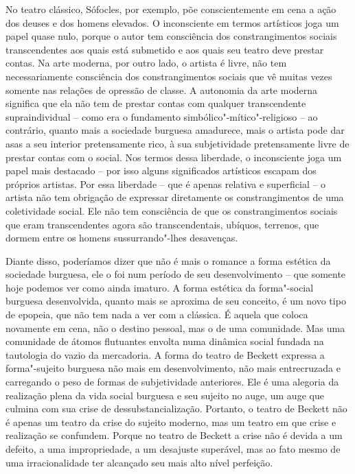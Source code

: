 {No teatro clássico, Sófocles, por exemplo, põe conscientemente em cena a
ação dos deuses e dos homens elevados. O inconsciente em termos
artísticos joga um papel quase nulo, porque o autor tem consciência dos
constrangimentos sociais transcendentes aos quais está submetido e aos
quais seu teatro deve prestar contas. Na arte moderna, por outro lado, o
artista é livre, não tem necessariamente consciência dos
constrangimentos sociais que vê muitas vezes somente nas relações de
opressão de classe. A autonomia da arte moderna significa que ela não
tem de prestar contas com qualquer transcendente supraindividual -- como
era o fundamento simbólico"-mítico"-religioso -- ao contrário, quanto mais
a sociedade burguesa amadurece, mais o artista pode dar asas a seu
interior pretensamente rico, à sua subjetividade pretensamente livre de
prestar contas com o social. Nos termos dessa liberdade, o inconsciente
joga um papel mais destacado -- por isso alguns significados artísticos
escapam dos próprios artistas. Por essa liberdade -- que é apenas
relativa e superficial -- o artista não tem obrigação de expressar
diretamente os constrangimentos de uma coletividade social. Ele não tem
consciência de que os constrangimentos sociais que eram transcendentes
agora são transcendentais, ubíquos, terrenos, que dormem entre os homens
sussurrando"-lhes desavenças.

Diante disso, poderíamos dizer que não é mais o romance a forma estética
da sociedade burguesa, ele o foi num período de seu desenvolvimento --
que somente hoje podemos ver como ainda imaturo. A forma estética da
forma"-social burguesa desenvolvida, quanto mais se aproxima de seu
conceito, é um novo tipo de epopeia, que não tem nada a ver com a
clássica. É aquela que coloca novamente em cena, não o destino pessoal,
mas o de uma comunidade. Mas uma comunidade de átomos flutuantes envolta
numa dinâmica social fundada na tautologia do vazio da mercadoria. A
forma do teatro de Beckett expressa a forma"-sujeito burguesa não mais em
desenvolvimento, não mais entrecruzada e carregando o peso de formas de
subjetividade anteriores. Ele é uma alegoria da realização plena da vida
social burguesa e seu sujeito no auge, um auge que culmina com sua crise
de dessubstancialização. Portanto, o teatro de Beckett não é apenas um
teatro da crise do sujeito moderno, mas um teatro em que crise e
realização se confundem. Porque no teatro de Beckett a crise não é
devida a um defeito, a uma impropriedade, a um desajuste superável, mas
ao fato mesmo de uma irracionalidade ter alcançado seu mais alto nível
perfeição.

}
